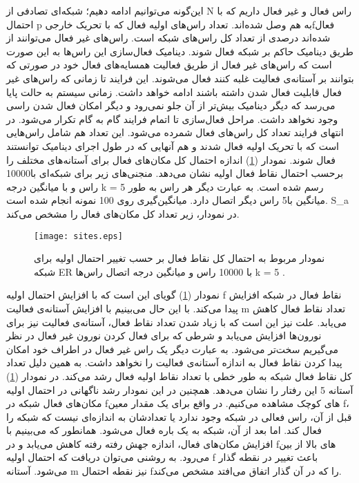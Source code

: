 این‌گونه می‌توانیم ادامه دهیم؛ شبکه‌ای تصادفی از N راس فعال و غیر فعال داریم که با احتمال p به هم وصل شده‌اند. تعداد راس‌های اولیه فعال که با تحریک خارجیfفعال شده‌اند درصدی از تعداد کل راس‌های شبکه است. راس‌های غیر فعال می‌توانند از طریق دینامیک حاکم بر شبکه فعال شوند. دینامیک فعال‌سازی این راس‌ها به این صورت است که راس‌های غیر فعال از طریق فعالیت همسایه‌های فعال خود در صورتی که بتوانند بر آستانه‌ی فعالیت غلبه کنند فعال می‌شوند. این فرایند تا زمانی که راس‌های غیر فعال قابلیت فعال شدن داشته باشند ادامه خواهد داشت. زمانی سیستم به حالت پایا می‌رسد که دیگر دینامیک بیش‌تر از آن جلو نمی‌رود  و دیگر امکان فعال شدن راسی وجود نخواهد داشت. مراحل  فعال‌سازی  تا اتمام فرایند گام به گام تکرار می‌شود. در انتهای فرایند تعداد کل راس‌های فعال شمرده می‌شود. این تعداد  هم شامل راس‌هایی است که با تحریک اولیه فعال شدند و هم آنهایی که در طول اجرای دینامیک توانستند فعال شوند. نمودار (\ref{fig:sites}) اندازه احتمال کل مکان‌های فعال  برای آستانه‌های مختلف  را برحسب احتمال نقاط فعال اولیه نشان می‌دهد. منجنی‌های زیر برای شبکه‌ای با10000 راس و با میانگین درجه 
\lqngle k \rangle = 5  رسم شده  است.  به عبارت دیگر هر راس به طور میانگین با5 راس دیگر اتصال دارد. میانگین‌گیری روی 100
 نمونه انجام شده است. S_{a} در نمودار، زیر تعداد کل مکان‌های فعال را مشخص می‌کند.

\begin{figure} [htbp]
\centering
\texttt{[image: sites.eps]} 
\caption [نمودار مربوط به احتمال کل نقاط فعال بر  حسب  تغییر احتمال اولیه برای شبکه ER]{\footnotesize نمودار مربوط به احتمال کل نقاط فعال بر  حسب  تغییر احتمال اولیه برای شبکه ER با 10000 راس و  میانگین درجه اتصال راس‌ها  \lqngle k \rangle = 5 .}
\label{fig:sites}
\end{figure}
نمودار (\ref{fig:sites}) گویای این است که با افزایش احتمال اولیه f  نقاط فعال در شبکه افزایش پیدا می‌کند. با این حال می‌بینیم با افزایش آستانه‌ی فعالیت m تعداد نقاط فعال کاهش می‌یابد. علت نیز این است که با زیاد شدن تعداد نقاط فعال، آستانه‌ی فعالیت نیز برای نورون‌ها افزایش می‌یابد و شرطی که برای فعال کردن نورون غیر فعال در نظر می‌گیریم سخت‌تر می‌شود. به عبارت دیگر یک راس غیر فعال در اطراف خود امکان پیدا کردن نقاط فعال  به اندازه آستانه‌ی فعالیت را نخواهد داشت. به همین دلیل تعداد کل نقاط فعال  شبکه به طور خطی با تعداد نقاط اولیه فعال رشد می‌کند. در نمودار (\ref{fig:sites})  آستانه  5 این رفتار را نشان می‌دهد. همچنین در این نمودار رشد ناگهانی  در احتمال اولیه مکان‌های  فعال شبکه در fهای کوچک مشاهده می‌کنیم. در واقع برای یک مقدار معین f، قبل از آن، راس فعالی در شبکه وجود ندارد یا تعدادشان به اندازه‌ای نیست که شبکه را فعال کند. اما بعد از آن،  شبکه به یک باره فعال می‌شود. همانطور که می‌بینیم با افزایش مکان‌های فعال، اندازه جهش  رفته رفته کاهش می‌یابد و در fهای بالا از بین می‌رود. به روشنی می‌توان دریافت که احتمال  اولیه f باعث تغییر در نقطه گذار می‌شود. آستانه m نیز نقطه احتمال fرا که در آن گذار اتفاق می‌افتد مشخص می‌کند.

